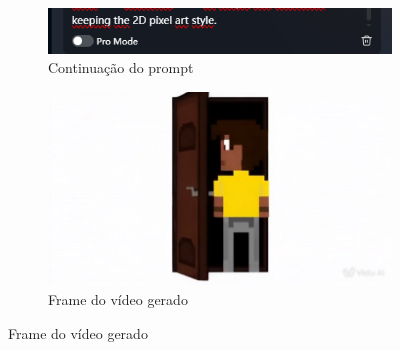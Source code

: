 \begin{figure}[htbp]
\begin{subfigure}{0.52\linewidth}
        \includegraphics[width=1\linewidth]{figs/vidu/tela13_resto.PNG}
        \caption{\small Continuação do prompt}
        \label{fig:vidu13b}
    \end{subfigure}
    \begin{subfigure}{0.55\linewidth}
        \includegraphics[width=1\linewidth]{figs/vidu/frame13.jpg}
        \caption{\small Frame do vídeo gerado}
        \label{fig:vidu13c}
    \end{subfigure}
\end{figure}


